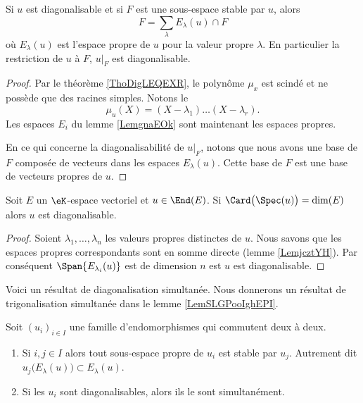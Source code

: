 \begin{corollary}       \label{CorQeVqsS}
    Si \( u\) est diagonalisable et si \( F\) est une sous-espace stable par \( u\), alors
    \begin{equation}
        F=\sum_{\lambda}E_{\lambda}(u)\cap F
    \end{equation}
    où \( E_{\lambda}(u)\) est l'espace propre de \( u\) pour la valeur propre \( \lambda\). En particulier la restriction de \( u\) à \( F\), \( u|_F\) est diagonalisable.
\end{corollary}

\begin{proof}
    Par le théorème \ref{ThoDigLEQEXR}, le polynôme \( \mu_x\) est scindé et ne possède que des racines simples. Notons le
    \begin{equation}
        \mu_u(X)=(X-\lambda_1)\ldots (X-\lambda_r).
    \end{equation}
    Les espaces \( E_i\) du lemme \ref{LemgnaEOk} sont maintenant les espaces propres.

    En ce qui concerne la diagonalisabilité de \( u|_F\), notons que nous avons une base de \( F\) composée de vecteurs dans les espaces \( E_{\lambda}(u)\). Cette base de \( F\) est une base de vecteurs propres de \( u\).
\end{proof}

\begin{lemma}
    Soit \( E\) un \( \eK\)-espace vectoriel et \( u\in\End(E)\). Si \( \Card\big( \Spec(u) \big)=\dim(E)\) alors \( u\) est diagonalisable.
\end{lemma}

\begin{proof}
    Soient \( \lambda_1,\ldots, \lambda_n\) les valeurs propres distinctes de \( u\). Nous savons que les espaces propres correspondants sont en somme directe (lemme \ref{LemjcztYH}). Par conséquent \( \Span\{ E_{\lambda_i}(u) \}\) est de dimension \( n\) est \( u\) est diagonalisable.
\end{proof}

Voici un résultat de diagonalisation simultanée. Nous donnerons un résultat de trigonalisation simultanée dans le lemme \ref{LemSLGPooIghEPI}.
\begin{proposition}     \label{PropGqhAMei}
    Soit \( (u_i)_{i\in I}\) une famille d'endomorphismes qui commutent deux à deux.
    \begin{enumerate}
        \item       \label{ItemGqhAMei}
            Si \( i,j\in I\) alors tout sous-espace propre de \( u_i\) est stable par \( u_j\). Autrement dit \( u_j\big(E_{\lambda}(u)\big)\subset E_{\lambda}(u)\).
        \item
            Si les \( u_i\) sont diagonalisables, alors ils le sont simultanément.
    \end{enumerate}
\end{proposition}

